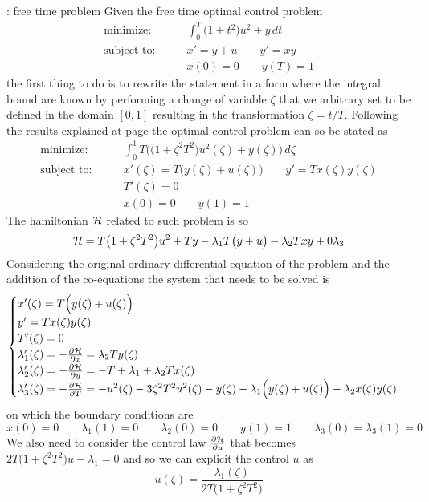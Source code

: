 \begin{example}{: free time problem}
	Given the free time optimal control problem
	\begin{align*}
		\textrm{minimize:} \qquad & \int_0^T \big(1+t^2\big) u^2 + y\, dt  \\
		\textrm{subject to:} \qquad & x' = y + u \qquad y' = xy \\
		& x(0) = 0\qquad y(T) = 1
	\end{align*}
	the first thing to do is to rewrite the statement in a form where the integral bound are known by performing a change of variable $\zeta$ that we arbitrary set to be defined in the domain $[0,1]$ resulting in the transformation $\zeta = t/T$. Following the results explained at page \pageref{sec:freetimeprob} the optimal control problem can so be stated as
	\begin{align*}
		\textrm{minimize:} \qquad & \int_0^1 T\Big( \big(1+\zeta^2 T^2\big) u^2(\zeta) + y(\zeta) \Big)\, d\zeta  \\
		\textrm{subject to:} \qquad & x'(\zeta) = T\Big( y(\zeta) + u(\zeta)\Big) \qquad y' = T x(\zeta)y(\zeta) \\
		& T'(\zeta) = 0 \\		& x(0) = 0\qquad y(1) = 1
	\end{align*}
	The hamiltonian $\mathcal{H}$ related to such problem is so
	\[ \mathcal{H} = T \big(1+\zeta^2 T^2\big) u^2 + T y - \lambda_1 T \big(y+u\big) - \lambda_2 T x y + 0 \lambda_3 \]
	Considering the original ordinary differential equation of the problem and the addition of the co-equations the system that needs to be solved is
	\[ \begin{cases}
		x'(\zeta) = T\Big( y(\zeta) + u(\zeta)\Big) \\ y' = T x(\zeta)y(\zeta) \\
		T'(\zeta) = 0 \\
		\lambda_1'(\zeta) = -\frac{\partial \mathcal{H}}{\partial x} = \lambda_2 T y(\zeta) \\
		\lambda_2'(\zeta) = -\frac{\partial \mathcal{H}}{\partial y} = -T +\lambda_1 +\lambda_2 T x(\zeta) \\
		\lambda_3'(\zeta) = -\frac{\partial \mathcal{H}}{\partial T} = - u^2(\zeta) - 3\zeta^2T^2 u^2(\zeta) - y(\zeta) - \lambda_1\Big(y(\zeta) +u(\zeta)\Big) -\lambda_2 x(\zeta)y(\zeta)
	\end{cases} \]
	on which the boundary conditions are
	\[ x(0)=  0 \qquad \lambda_1(1) = 0 \qquad \lambda_2(0) = 0 \qquad y(1) = 1 \qquad \lambda_3(0) = \lambda_3(1) = 0 \]
	We also need to consider the control law $\frac{\partial \mathcal{H}}{\partial u}$ that becomes $2T\big( 1 + \zeta^2 T^2\big)u - \lambda_1 = 0$ and so we can explicit the control $u$ as
	\[ u(\zeta) = \frac{\lambda_1(\zeta)}{2T \big(1 + \zeta	^2T^2\big)} \]
	
\end{example}

